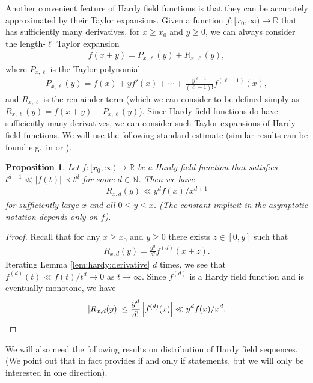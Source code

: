 \documentclass{amsart}
\newtheorem{proposition}[theorem]{Proposition}
\theoremstyle{definition}
\newcommand{\abs}[1]{\left|#1\right|}
\newcommand{\NN}{\mathbb{N}}
\newcommand{\RR}{\mathbb{R}}
\begin{document}
Another convenient feature of Hardy field functions is that they can be accurately approximated by their Taylor expansions. Given a function $f \colon [x_0,\infty) \to \RR$ that has sufficiently many derivatives, for $x \geq x_0$ and $y \geq 0$, we can always consider the length-$\ell$ Taylor expansion 
\begin{align*}\label{eq:hardy:taylor-decomp}
	f(x+y) = P_{x,\ell}(y) + R_{x,\ell}(y),
\end{align*}
where $P_{x,\ell}$ is the Taylor polynomial
\begin{align*}
	P_{x,\ell}(y) = f(x) + y f'(x) + \cdots + \frac{y^{\ell-1}}{(\ell-1)!} f^{(\ell-1)}(x),
\end{align*}
and $R_{x,\ell}$ is the remainder term (which we can consider to be defined simply as $R_{x,\ell}(y) = f(x+y) - P_{x,\ell}(y)$). Since Hardy field functions do have sufficiently many derivatives, we can consider such Taylor expansions of Hardy field functions. We will use the following standard estimate (similar results can be found e.g.\ in \cite{Frantzikinakis-2009} or \cite[Prop.\ 2.9]{KoniecznyMullner-2024}).

\begin{proposition}\label{prop:hardy:taylor}
	Let $f \colon [x_0, \infty) \to \RR$ be a Hardy field function that satisfies $t^{d-1} \ll \abs{f(t)} \prec t^d$ for some $d \in \NN$. Then we have
\begin{align*}
	R_{x,d}(y) \ll y^{d} f(x)/x^{d+1}
\end{align*}
for sufficiently large $x$ and all $0 \leq y \leq x$. (The constant implicit in the asymptotic notation depends only on $f$).
\end{proposition}
\begin{proof}
Recall that for any $x \geq x_0$ and $y \geq 0$ there exists $z \in [0,y]$ such that
	\begin{align*}
	R_{x,d}(y) = \frac{y^{d}}{d!} f^{(d)}(x+z).
	\end{align*}
	Iterating Lemma \ref{lem:hardy:derivative} $d$ times, we see that $f^{(d)}(t) \ll f(t)/t^d \to 0$ as $t \to \infty$. Since $f^{(d)}$ is a Hardy field function and is eventually monotone, we have
	\begin{equation*}
	\abs{R_{x,d}(y)} \leq \frac{y^{d}}{d!} \abs{ f^{(d)}(x)} \ll y^d f(x)/x^d. \qedhere
	\end{equation*}
\end{proof}


We will also need the following results on distribution of Hardy field sequences. (We point out that \cite{Boshernitzan-1994} in fact provides if and only if statements, but we will only be interested in one direction).
\end{document}
